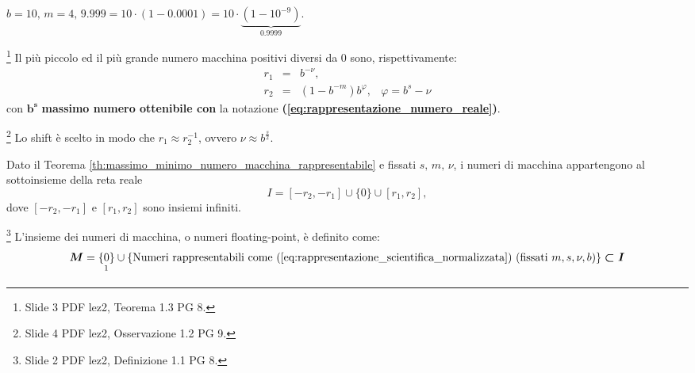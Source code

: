 


\begin{example}
	$b=10,\, m=4,\, 9.999=10\cdot(1-0.0001)=10\cdot\underbrace{(1-10^{-9})}_{0.9999}.$
\end{example}

\begin{theorem}\label{th:massimo_minimo_numero_macchina_rappresentabile}\footnote{Slide 3 PDF lez2, Teorema 1.3 PG 8.}
	Il più piccolo ed il più grande numero macchina positivi diversi da 0 sono, rispettivamente:
	\begin{equation}\label{eq:massimo_minimo_numero_macchina_rappresentabile}
		\begin{matrix}
			r_1 &=& b^{-\nu},&\\
			r_2 &=& (1-b^{-m})b^\varphi,& \varphi=b^s-\nu
		\end{matrix}
	\end{equation}
	con $\boldsymbol{b^s}$ \textbf{massimo numero ottenibile con} la notazione \textbf{(\ref{eq:rappresentazione_numero_reale})}.
\end{theorem}

\begin{remark}\footnote{Slide 4 PDF lez2, Osservazione 1.2 PG 9.}
	Lo shift è scelto in modo che $r_1\approx r_2^{-1}$, ovvero $\nu\approx b^{\frac{s}{2}}$.
\end{remark}

\begin{definition}
	Dato il Teorema \ref{th:massimo_minimo_numero_macchina_rappresentabile} e fissati $s,\,m,\,\nu$, i numeri di macchina appartengono al sottoinsieme della reta reale
	\begin{equation}\label{eq:insieme_numeri_reali_rappresentabili}
		I=[-r_2,-r_1]\cup \{0\}\cup [r_1,r_2],
	\end{equation}
	dove $[-r_2,-r_1]$ e $[r_1,r_2]$ sono insiemi infiniti.
\end{definition}

\begin{definition}\footnote{Slide 2 PDF lez2, Definizione 1.1 PG 8.}
	L'insieme dei numeri di macchina, o numeri floating-point, è definito come:
	\begin{equation}
		\boldsymbol{M} = \underset{\footnotemark}{\{0\}}\cup \{\text{Numeri rappresentabili come (\ref{eq:rappresentazione_scientifica_normalizzata}) (fissati }m,s,\nu, b) \} \boldsymbol{\subset I}
	\end{equation}
\end{definition}

